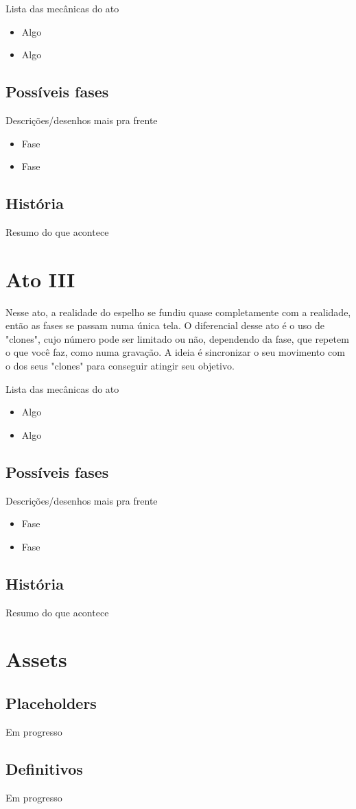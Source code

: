 \documentclass[a4paper, 11pt]{article}
\begin{document}
	Lista das mecânicas do ato
	\begin{itemize}
		\item Algo
		\item Algo
	\end{itemize}

\subsection{Possíveis fases}

	Descrições/desenhos mais pra frente
	\begin{itemize}
		\item Fase
		\item Fase
	\end{itemize}

\subsection{História}

	Resumo do que acontece

\section{Ato III}

	Nesse ato, a realidade do espelho se fundiu quase completamente com a realidade, então as fases se passam numa única
	tela. O diferencial desse ato é o uso de "clones", cujo número pode ser limitado ou não, dependendo da fase, que repetem o que você faz, como numa gravação. A ideia é sincronizar o seu movimento com o dos seus "clones" para conseguir atingir seu objetivo.

	Lista das mecânicas do ato
	\begin{itemize}
		\item Algo
		\item Algo
	\end{itemize}

\subsection{Possíveis fases}

	Descrições/desenhos mais pra frente
	\begin{itemize}
		\item Fase
		\item Fase
	\end{itemize}

\subsection{História}

	Resumo do que acontece

\section{Assets}

\subsection{Placeholders}
	Em progresso

\subsection{Definitivos}
	Em progresso
\end{document}
